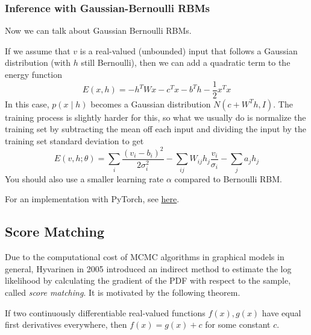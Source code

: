 \documentclass{article}
\begin{document}
  \subsubsection{Inference with Gaussian-Bernoulli RBMs}

    Now we can talk about Gaussian Bernoulli RBMs. 

    \begin{definition} 
      If we assume that $v$ is a real-valued (unbounded) input that follows a Gaussian distribution (with $h$ still Bernoulli), then we can add a quadratic term to the energy function 
      \begin{equation} 
        E(x, h) = - h^T W x - c^T x - b^T h - \frac{1}{2} x^T x
      \end{equation}
      In this case, $p(x \mid h)$ becomes a Gaussian distribution $N(c + W^T h, I)$. The training process is slightly harder for this, so what we usually do is normalize the training set by subtracting the mean off each input and dividing the input by the training set standard deviation to get  
      \begin{equation} 
        E(v, h; \theta) = \sum_i \frac{(v_i - b_i)^2}{2 \sigma_i^2} - \sum_{ij} W_{ij} h_j \frac{v_i}{\sigma_i} - \sum_j a_j h_j
      \end{equation}
      You should also use a smaller learning rate $\alpha$ compared to Bernoulli RBM. 
    \end{definition} 

    \begin{algo}[Implementation]
      For an implementation with PyTorch, see \href{code/rbm.html}{here}. 
    \end{algo}

\subsection{Score Matching} 

    Due to the computational cost of MCMC algorithms in graphical models in general, Hyvarinen in 2005 introduced an indirect method to estimate the log likelihood by calculating the gradient of the PDF with respect to the sample, called \textit{score matching}. It is motivated by the following theorem. 

    \begin{theorem}
      If two continuously differentiable real-valued functions $f(x), g(x)$ have equal first derivatives everywhere, then $f(x) = g(x) + c$ for some constant $c$. 
    \end{theorem}
\end{document}
